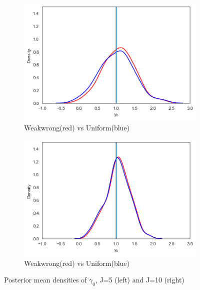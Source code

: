 \begin{figure}[h!]
  \centering
  \begin{subfigure}[b]{0.4\linewidth}
    \includegraphics[width=\linewidth]{graphics/mean_plot_gamma0_unib_weakwrongr}
    \caption{Weakwrong(red) vs Uniform(blue)}
  \end{subfigure}
  \begin{subfigure}[b]{0.4\linewidth}
    \includegraphics[width=\linewidth]{graphics/mean_plot_gamma0_unib_weakwrongr2}
    \caption{Weakwrong(red) vs Uniform(blue)}
  \end{subfigure}
  \caption{Posterior mean densities of $\gamma_0$, J=5 (left) and J=10 (right)}
  \label{fig:weak_uni}
\end{figure}


